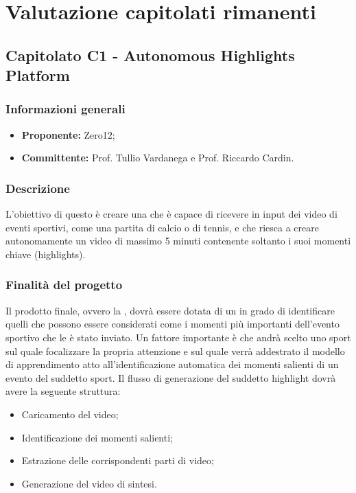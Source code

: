 

\section{Valutazione capitolati rimanenti}
    \subsection{Capitolato C1 - Autonomous Highlights Platform}
       \subsubsection{Informazioni generali}
       \begin{itemize}
           \item \textbf{Proponente: }Zero12;
           \item \textbf{Committente: }Prof. Tullio Vardanega e Prof. Riccardo Cardin.
       \end{itemize}

    \subsubsection{Descrizione}
        L'obiettivo di questo  è creare una  che è capace di ricevere in input dei video di eventi sportivi, come una partita di calcio o di tennis, e che riesca a creare autonomamente un video di massimo 5 minuti contenente soltanto i suoi momenti chiave (highlights). 
    
    \subsubsection{Finalità del progetto}
        Il prodotto finale, ovvero la , dovrà essere dotata di un  in grado di identificare quelli che possono essere considerati come i momenti più importanti dell'evento sportivo che le è stato inviato. Un fattore importante è che andrà scelto uno sport sul quale focalizzare la propria attenzione e sul quale verrà addestrato il modello di apprendimento atto all'identificazione automatica dei momenti salienti di un evento del suddetto sport.  
        Il flusso di generazione del suddetto highlight dovrà avere la seguente struttura:
        \begin{itemize}
            \item Caricamento del video; 
            \item Identificazione dei momenti salienti;
            \item Estrazione delle corrispondenti parti di video;
            \item Generazione del video di sintesi.
        \end{itemize}
